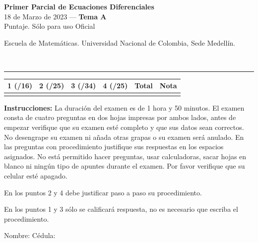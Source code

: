 \documentclass[11pt]{article}
\begin{document}
\noindent
\begin{minipage}[t]{0.62\linewidth}
  {\bfseries\large Primer Parcial de Ecuaciones Diferenciales}\\[2pt]
  {\small 18 de Marzo de 2023 --- \textbf{Tema A}}\\
  {\small Puntaje. Sólo para uso Oficial}
\end{minipage}%
\hfill
\begin{minipage}[t]{0.35\linewidth}
  \raggedleft\small Escuela de Matemáticas. Universidad Nacional de Colombia, Sede Medellín.
\end{minipage}\\[4pt]
\rule{\linewidth}{0.6pt}

\vspace{4pt}
\noindent
\begin{tabular}{|c|c|c|c|c|c|}
\hline
1 (/16) & 2 (/25) & 3 (/34) & 4 (/25) & Total & Nota \\
\hline
 & & & & & \\
\hline
\end{tabular}

\vspace{6pt}
\noindent\textbf{Instrucciones:} La duración del examen es de 1 hora y 50 minutos. El examen consta de cuatro preguntas en dos hojas impresas por ambos lados, antes de empezar verifique que su examen esté completo y que sus datos sean correctos. No desengrape su examen ni añada otras grapas o su examen será anulado. En las preguntas con procedimiento justifique sus respuestas en los espacios asignados. No está permitido hacer preguntas, usar calculadoras, sacar hojas en blanco ni ningún tipo de apuntes durante el examen. Por favor verifique que su celular esté apagado.

\vspace{4pt}
\noindent En los puntos 2 y 4 debe justificar paso a paso su procedimiento.

\noindent En los puntos 1 y 3 sólo se calificará respuesta, no es necesario que escriba el procedimiento.

\vspace{8pt}
\noindent Nombre: \makebox[0.45\linewidth]{\hrulefill} \hfill Cédula: \makebox[0.3\linewidth]{\hrulefill}
\end{document}
